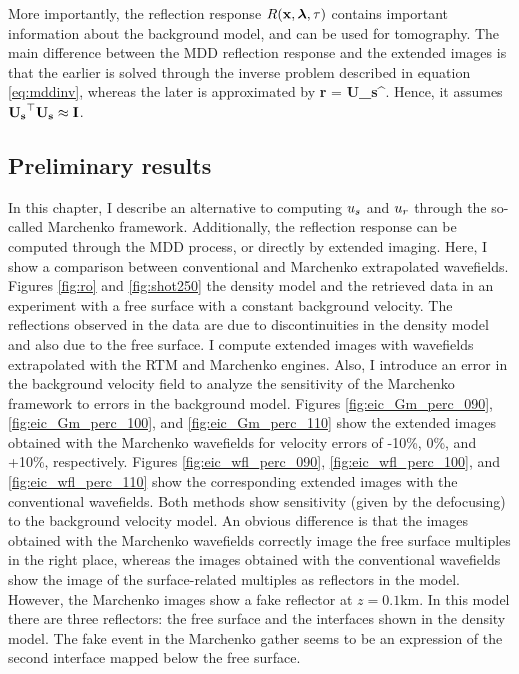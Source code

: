 More importantly, the reflection response $R({\bf x},{\boldsymbol{\lambda}},\tau)$ contains important information
about the background model, and can be used for tomography. The main difference between
the MDD reflection response and the extended images is that the earlier 
is solved through the inverse problem described in equation \ref{eq:mddinv}, whereas
the later is approximated by
\beq
  {\bf r } = {\bf U_s}^.
\eeq
Hence, it assumes ${\bf U_s}^\top{\bf U_s} \approx {\bf I}$.


\subsection{Preliminary results}

In this chapter, I describe an alternative to computing $u_s$ and $u_r$ through 
the so-called Marchenko framework. Additionally, the reflection response can be computed 
through the MDD process, or directly by extended imaging. 
 Here, I show a comparison between conventional and Marchenko extrapolated wavefields. 
Figures \ref{fig:ro} and \ref{fig:shot250}  the density model  and the 
retrieved data in an experiment with a free surface with a constant background velocity. The reflections observed 
in the data are due to discontinuities in the density model and also due to the free surface. 
 I compute extended images with wavefields extrapolated with the RTM and Marchenko
engines. Also, I introduce an error in the background velocity field 
to analyze the sensitivity of the Marchenko framework to errors
in the background model. 
 Figures \ref{fig:eic_Gm_perc_090}, \ref{fig:eic_Gm_perc_100}, and \ref{fig:eic_Gm_perc_110}
show the extended images obtained with the Marchenko wavefields for 
velocity errors of -10\%, 0\%, and +10\%, respectively. 
  Figures \ref{fig:eic_wfl_perc_090}, \ref{fig:eic_wfl_perc_100}, and \ref{fig:eic_wfl_perc_110}
show the corresponding extended images with the conventional wavefields. 
 Both methods show sensitivity (given by the defocusing) to the background velocity 
model. An obvious difference is that the images obtained with the Marchenko 
wavefields correctly image the free surface multiples in the right place, whereas
the images obtained with the conventional wavefields show the image of
the surface-related multiples as reflectors in the model. However, the Marchenko 
images show a fake reflector at $z=0.1$km. In this model there are three reflectors:
 the free surface and the interfaces shown in the density model. The fake event
in the Marchenko gather seems to be an expression of the second interface mapped below the free surface.   




